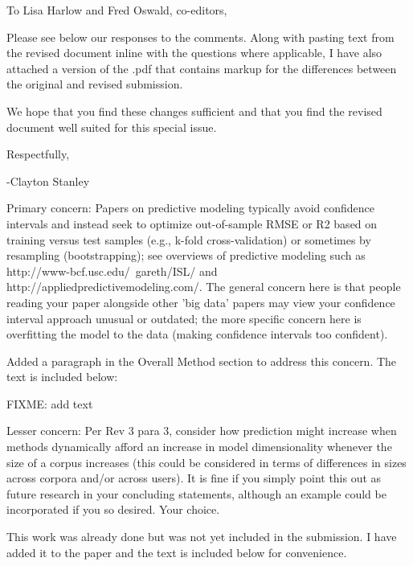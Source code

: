 \documentclass[answers,12pt]{exam}
\begin{document}
To Lisa	Harlow and Fred	Oswald,	co-editors, \bigskip

Please see below our responses to the comments.
Along with pasting text from the revised document inline with the questions where applicable,
I have also attached a version of the .pdf that contains markup for the differences between the original and revised submission. \bigskip 

We hope that you find these changes sufficient and that you find the revised document well suited for this special issue. \bigskip

Respectfully,

-Clayton Stanley

\bigskip
\bigskip

\begin{questions}

\question Primary concern: Papers on predictive modeling typically avoid confidence intervals and instead seek to optimize out-of-sample RMSE or R2 based on training versus test samples (e.g., k-fold cross-validation) or sometimes by resampling (bootstrapping); see overviews of predictive modeling such as http://www-bcf.usc.edu/~gareth/ISL/ and http://appliedpredictivemodeling.com/.  The general concern here is that people reading your paper alongside other 'big data' papers may view your confidence interval approach unusual or outdated; the more specific concern here is overfitting the model to the data (making confidence intervals too confident).

\begin{solution}
Added a paragraph in the Overall Method section to address this concern.
The text is included below:

FIXME: add text

\end{solution}

\question Lesser concern: Per Rev 3 para 3, consider how prediction might increase when methods dynamically afford an increase in model dimensionality whenever the size of a corpus increases (this could be considered in terms of differences in sizes across corpora and/or across users). It is fine if you simply point this out as future research in your concluding statements, although an example could be incorporated if you so desired. Your choice.

\begin{solution}
This work was already done but was not yet included in the submission.
I have added it to the paper and the text is included below for convenience.



\end{solution}
\end{questions}
\end{document}
